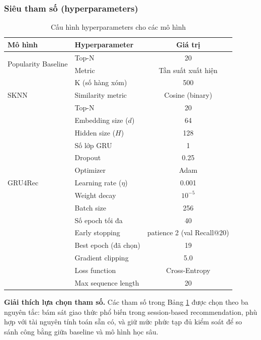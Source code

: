 \documentclass[12pt, a4paper]{article}
\begin{document}
\subsubsection{Siêu tham số (hyperparameters)}

\begin{table}[H]
\centering
\caption{Cấu hình hyperparameters cho các mô hình}
\label{tab:hyperparams}
\begin{tabular}{llc}
\toprule
\textbf{Mô hình} & \textbf{Hyperparameter} & \textbf{Giá trị} \\
\midrule
\multirow{2}{*}{Popularity Baseline} & Top-N & 20 \\
& Metric & Tần suất xuất hiện \\
\midrule
\multirow{3}{*}{SKNN} & K (số hàng xóm) & 500 \\
& Similarity metric & Cosine (binary) \\
& Top-N & 20 \\
\midrule
\multirow{11}{*}{GRU4Rec} & Embedding size ($d$) & 64 \\
& Hidden size ($H$) & 128 \\
& Số lớp GRU & 1 \\
& Dropout & 0.25 \\
& Optimizer & Adam \\
& Learning rate ($\eta$) & 0.001 \\
& Weight decay & $10^{-5}$ \\
& Batch size & 256 \\
& Số epoch tối đa & 40 \\
& Early stopping & patience 2 (val Recall@20) \\
& Best epoch (đã chọn) & 19 \\
& Gradient clipping & 5.0 \\
& Loss function & Cross-Entropy \\
& Max sequence length & 20 \\
\bottomrule
\end{tabular}
\end{table}

\textbf{Giải thích lựa chọn tham số.} Các tham số trong Bảng \ref{tab:hyperparams} được chọn theo ba nguyên tắc: bám sát giao thức phổ biến trong session-based recommendation, phù hợp với tài nguyên tính toán sẵn có, và giữ mức phức tạp đủ kiểm soát để so sánh công bằng giữa baseline và mô hình học sâu.
\end{document}
